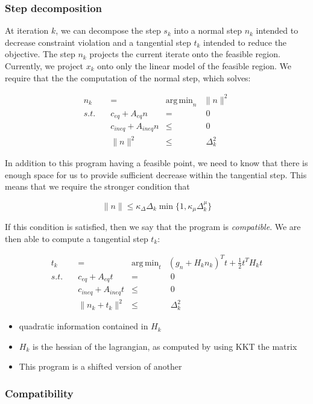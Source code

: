 \documentclass{article} %
\DeclareMathOperator*{\argmin}{arg\,min}
\begin{document}
\subsubsection{Step decomposition}
At iteration $k$, we can decompose the step $s_k$ into a normal step $n_k$ intended to decrease constraint violation and a tangential step $t_k$ intended to reduce the objective.
The step $n_k$ projects the current iterate onto the feasible region.
Currently, we project $x_k$ onto only the linear model of the feasible region.
We require that the the computation of the normal step, which solves:

\begin{align*}
n_k &=& \argmin_n           & \|n\|^2 \\
s.t. \quad & c_{eq} + A_{eq}n     &=&\; 0 \\
     & c_{ineq} + A_{ineq}n &\le& \; 0  \\
     & \| n \|^2            &\le& \; \Delta_k^2
\end{align*}

In addition to this program having a feasible point, we need to know that there is enough space for us to provide sufficient decrease within the tangential step. This means that we require the stronger condition that

$$\|n\|\le \kappa_{\Delta} \Delta_k \min \{1, \kappa_{\mu}\Delta_k^{\mu}\}$$

If this condition is satisfied, then we say that the program is \emph{compatible}. We are then able to compute a tangential step $t_k$:

\begin{align*}
t_k &=& \argmin_t           & (g_n+H_kn_k)^Tt + \frac 1 2 t^T H_k t \\
s.t. \quad & c_{eq} + A_{eq}t	&=& \; 0 \\
     & c_{ineq} + A_{ineq}t	&\le& \; 0  \\
     & \| n_k + t_k \|^2 		&\le& \; \Delta_k ^2
\end{align*}

\begin{itemize}
\item quadratic information contained in $H_k$
\item $H_k$ is the hessian of the lagrangian, as computed by using KKT the matrix
\item This program is a shifted version of another
\end{itemize}

\subsubsection{Compatibility}
\end{document}
